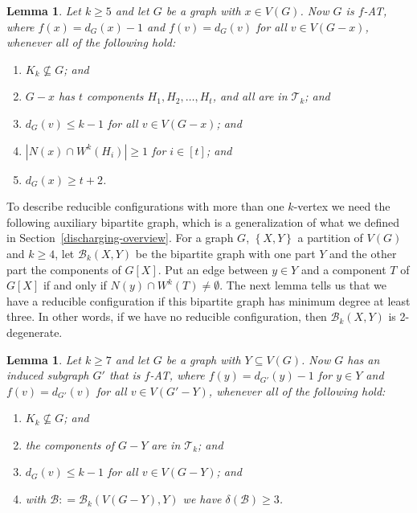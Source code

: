 \documentclass[12pt]{article}
\theoremstyle{plain}
\newtheorem{lem}[thm]{Lemma}
\theoremstyle{definition}
\theoremstyle{remark}
\newcommand{\fancy}[1]{\mathcal{#1}}
\newcommand{\T}{\fancy{T}}
\newcommand{\B}{\fancy{B}}
\newcommand{\set}[1]{\left\{ #1 \right\}}
\newcommand{\card}[1]{\left|#1\right|}
\newcommand{\irange}[1]{\left[#1\right]}
\newcommand{\DefinedAs}{\mathrel{\mathop:}=}
\begin{document}
\begin{lem}\label{ConfigurationTypeOneEuler}
Let $k \ge 5$ and let $G$ be a graph with $x \in V(G)$.  
Now $G$ is $f$-AT,
where $f(x) = d_G(x) - 1$ and $f(v) = d_G(v)$ for all $v \in V(G - x)$,
whenever all of the following hold:
\begin{enumerate}
\item $K_k \not \subseteq G$; and
\item $G-x$ has $t$ components $H_1, H_2, \ldots, H_t$, and all are in $\T_k$; and
\item $d_G(v) \leq k - 1$ for all $v \in V(G-x)$; and
\item $\card{N(x) \cap W^k(H_i)} \ge 1$ for $i \in \irange{t}$; and
\item $d_G(x) \ge t+2$.
\end{enumerate}

\end{lem}

To describe reducible configurations with more than one $k$-vertex we need the
following auxiliary bipartite graph, which is a generalization of what we
defined in Section~\ref{discharging-overview}.  For a graph $G$, $\set{X, Y}$ a
partition of $V(G)$ and $k
\ge 4$, let $\B_k(X, Y)$ be the bipartite graph with one part $Y$ and the other
part the components of $G[X]$.  Put an edge between $y \in Y$ and a component
$T$ of $G[X]$ if and only if $N(y) \cap W^k(T) \ne \emptyset$.   The next lemma
tells us that we have a reducible configuration if this bipartite graph has
minimum degree at least three.  In other words, if we have no reducible
configuration, then $\B_k(X,Y)$ is 2-degenerate.

\begin{lem}
\label{MultipleHighConfigurationEuler} 
Let $k\ge7$ and let $G$ be a graph with $Y\subseteq V(G)$.  Now $G$ has an
induced subgraph $G'$ that is $f$-AT, where $f(y)=d_{G'}(y)-1$ for $y\in Y$ and
$f(v)=d_{G'}(v)$ for all $v\in V(G'-Y)$, whenever all of the following hold:
	\begin{enumerate}
		\item $K_{k}\not\subseteq G$; and 
		\item the components of $G-Y$ are in $\T_{k}$; and 
		\item $d_{G}(v)\leq k-1$ for all $v\in V(G-Y)$; and 
		\item with $\B\DefinedAs\B_{k}(V(G-Y),Y)$ we have $\delta(\B)\ge3$. 
	\end{enumerate}
\end{lem}
\end{document}
